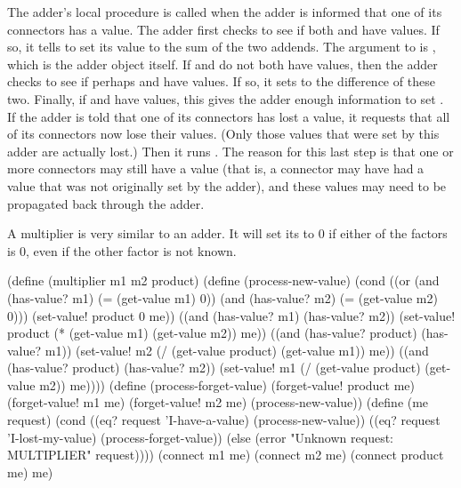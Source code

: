 \noindent
The adder's local procedure  is called when the adder
is informed that one of its connectors has a value. The adder first checks to
see if both  and  have values. If so, it tells  to
set its value to the sum of the two addends.  The  argument to
 is , which is the adder object itself.  If 
and  do not both have values, then the adder checks to see if perhaps
 and  have values.  If so, it sets  to the
difference of these two.  Finally, if  and  have values,
this gives the adder enough information to set .  If the adder is told
that one of its connectors has lost a value, it requests that all of its
connectors now lose their values.  (Only those values that were set by this
adder are actually lost.)  Then it runs .  The reason
for this last step is that one or more connectors may still have a value (that
is, a connector may have had a value that was not originally set by the adder),
and these values may need to be propagated back through the adder.

A multiplier is very similar to an adder. It will set its  to 0
if either of the factors is 0, even if the other factor is not known.

\begin{codeBlock}
(define (multiplier m1 m2 product)
  (define (process-new-value)
    (cond ((or (and (has-value? m1)
                    (= (get-value m1) 0))
               (and (has-value? m2)
                    (= (get-value m2) 0)))
           (set-value! product 0 me))
          ((and (has-value? m1)
                (has-value? m2))
           (set-value! product
                       (* (get-value m1)
                          (get-value m2))
                       me))
          ((and (has-value? product)
                (has-value? m1))
           (set-value! m2
                       (/ (get-value product)
                          (get-value m1))
                       me))
          ((and (has-value? product)
                (has-value? m2))
           (set-value! m1
                       (/ (get-value product)
                          (get-value m2))
                       me))))
  (define (process-forget-value)
    (forget-value! product me)
    (forget-value! m1 me)
    (forget-value! m2 me)
    (process-new-value))
  (define (me request)
    (cond ((eq? request 'I-have-a-value)
           (process-new-value))
          ((eq? request 'I-lost-my-value)
           (process-forget-value))
          (else
            (error "Unknown request: MULTIPLIER"
                   request))))
  (connect m1 me)
  (connect m2 me)
  (connect product me)
  me)
\end{codeBlock}

